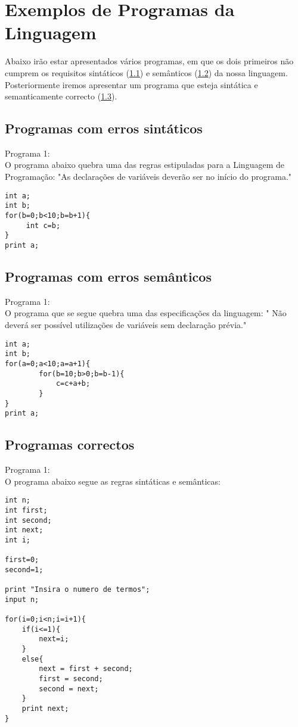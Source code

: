\documentclass{report}
\begin{document}
\section{Exemplos de Programas da Linguagem}
Abaixo irão estar apresentados vários programas, em que os dois primeiros não cumprem os requisitos sintáticos (\ref{esint}) e semânticos (\ref{esem}) da nossa linguagem. Posteriormente iremos apresentar um programa que esteja sintática e semanticamente correcto (\ref{pc}).
\subsection{Programas com erros sintáticos}\label{esint}
Programa 1:\\
O programa abaixo quebra uma das regras estipuladas para a Linguagem de Programação: "As declarações de variáveis deverão ser no início do programa."
\begin{verbatim}
int a;
int b;
for(b=0;b<10;b=b+1){
     int c=b;
}
print a;
\end{verbatim}
\subsection{Programas com erros semânticos}\label{esem}
Programa 1:\\
O programa que se segue quebra uma das especificações da linguagem: " Não deverá ser possível utilizações de variáveis sem declaração prévia."

\begin{verbatim}
int a;
int b;
for(a=0;a<10;a=a+1){
        for(b=10;b>0;b=b-1){
            c=c+a+b;
        }
}
print a;
\end{verbatim}
\subsection{Programas correctos}\label{pc}
Programa 1:\\
O programa abaixo segue as regras sintáticas e semânticas:
\begin{verbatim}
int n;
int first;
int second;
int next;
int i;
 
first=0;
second=1;
 
print "Insira o numero de termos";
input n;
 
for(i=0;i<n;i=i+1){
    if(i<=1){
        next=i;
    }
    else{
        next = first + second;
        first = second;
        second = next;
    }
    print next;
}
\end{verbatim}
\end{document}
